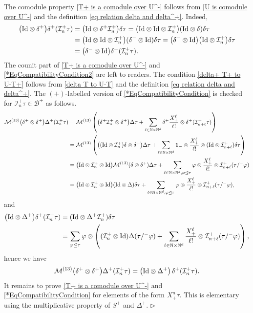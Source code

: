 \documentclass[10pt, reqno]{amsart}
\numberwithin{subsection}{section}
\numberwithin{subsubsection}{subsection}
\numberwithin{equation}{section} %
\newenvironment{Dem}[1][\unskip]{%
    \begin{list}{\hspace{1.15cm}{\sf \textbf{{\small Proof #1 --}}}}{%
        \setlength{\topsep}{0pt}%
        \setlength{\leftmargin}{0pt}%
        \setlength{\rightmargin}{0pt}%
        \setlength{\listparindent}{0pt}%
        \setlength{\itemindent}{0pt}%
        \setlength{\parsep}{0pt}%
        \addtolength{\leftmargin}{0pt}%
        \addtolength{\rightmargin}{0pt}%
    } \item }{\hfill $\rhd$\end{list}\smallskip}
\theoremstyle{mystyle}
\theoremstyle{mystyle2}
\theoremstyle{mystyle3}
\newcommand{\iden}{\text{\rm Id}}
\newcommand\bbN{\mathbb{N}}
\newcommand{\mcB}{\mathcal{B}}
\newcommand{\mcI}{\mathcal{I}}
\newcommand{\mcM}{\mathcal{M}}
\newcommand{\Xplus}{X_+}
\begin{document}
\begin{Dem}
The comodule property \eqref{T+ is a comodule over U^-} follows from \eqref{U is comodule over U^-} and the definition \eqref{eq relation delta and delta^+}.
Indeed,
\begin{align*}
\big(\iden\otimes\delta^+\big)\delta^+(\mcI_n^+\tau)
&=\big(\iden\otimes\delta^+\mcI_n^+\big)\delta\tau
=\big(\iden\otimes\iden\otimes\mcI_n^+\big)(\iden\otimes\delta)\delta\tau   \\
&=\big(\iden\otimes\iden\otimes\mcI_n^+\big)(\delta^-\otimes\iden)\delta\tau
=\big(\delta^-\otimes\iden\big)\big(\iden\otimes\mcI_n^+\big)\delta\tau 
  \\
&=\big(\delta^-\otimes\iden\big)\delta^+(\mcI_n^+\tau).
\end{align*}
The counit part of \eqref{T+ is a comodule over U^-} and \eqref{*EqCompatibilityCondition2} are left to readers.
The condition \eqref{delta+ T+ to U-T+} follows from \eqref{delta T to U-T} and the definition \eqref{eq relation delta and delta^+}.
The $(+)$-labelled version of \eqref{*EqCompatibilityCondition} is checked for $\mcI_n^+\tau\in\mcB^+$ as follows.
\begin{align*}
\mcM^{(13)}\big(\delta^+\otimes\delta^+\big)\Delta^+(\mcI_n^+\tau)
&= \mcM^{(13)}\left(\big(\delta^+\mcI_n^+\otimes\delta^+\big)\Delta\tau
+\sum_{\ell\in\bbN\times\bbN^d}\delta^+\frac{\Xplus^\ell}{\ell!}\otimes\delta^+(\mcI_{n+\ell}^+\tau)\right)   \\
&= \mcM^{(13)}\left(\big((\iden\otimes\mcI_n^+)\delta\otimes\delta^+\big)\Delta\tau
+\sum_{\ell\in\bbN\times\bbN^d}{\bf1}_-\otimes\frac{\Xplus^\ell}{\ell!}\otimes(\iden\otimes\mcI_{n+\ell}^+)\delta\tau\right)   \\
&= \big(\iden\otimes\mcI_n^+\otimes\iden\big)\mcM^{(13)}(\delta\otimes\delta^+)\Delta\tau
+\sum_{\ell\in\bbN\times\bbN^d, \varphi\trianglelefteq\tau}\varphi\otimes\frac{\Xplus^\ell}{\ell!}\otimes\mcI_{n+\ell}^+(\tau/^-\varphi)   \\
&= \big(\iden\otimes\mcI_n^+\otimes\iden\big)(\iden\otimes\Delta)\delta\tau
+\sum_{\ell\in\bbN\times\bbN^d, \varphi\trianglelefteq\tau}\varphi\otimes\frac{\Xplus^\ell}{\ell!}\otimes\mcI_{n+\ell}^+(\tau/^-\varphi),
\end{align*}
and
\begin{align*}
\big(\iden\otimes\Delta^+\big)\delta^+(\mcI_n^+\tau)
&=(\iden\otimes\Delta^+\mcI_n^+)\delta\tau   \\
&=\sum_{\varphi\trianglelefteq\tau}\varphi\otimes
\left((\mcI_n^+\otimes\iden)\Delta(\tau/^-\varphi)
+\sum_{\ell\in\bbN\times\bbN^d}\frac{\Xplus^\ell}{\ell!}\otimes\mcI_{n+\ell}^+(\tau/^-\varphi)\right),
\end{align*}
hence we have
$$
\mcM^{(13)}\big(\delta^+\otimes\delta^+\big)\Delta^+(\mcI_n^+\tau) =
\big(\iden\otimes\Delta^+\big)\,\delta^+(\mcI_n^+\tau).
$$
It remains to prove \eqref{T+ is a comodule over U^-} and \eqref{*EqCompatibilityCondition} for elements of the form $X_+^n\tau$. This is elementary using the multiplicative property of $S^+$ and $\Delta^+$.
\end{Dem}
\end{document}
